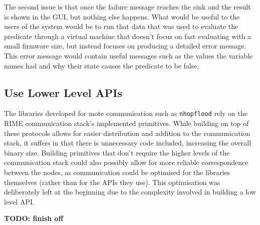 The second issue is that once the failure message reaches the sink and the result is shown in the GUI, but nothing else happens. What would be useful to the users of the system would be to run that data that was used to evaluate the predicate through a virtual machine that doesn't focus on fast evaluating with a small firmware size, but instead focuses on producing a detailed error message. This error message would contain useful messages such as the values the variable names had and why their state causes the predicate to be false.

\subsection{Use Lower Level APIs}

The libraries developed for mote communication such as \verb|nhopflood| rely on the RIME communication stack's implemented primitives. While building on top of these protocols allows for easier distribution and addition to the communication stack, it suffers in that there is unnecessary code included, increasing the overall binary size. Building primitives that don't require the higher levels of the communication stack could also possibly allow for more reliable correspondence between the nodes, as communication could be optimised for the libraries themselves (rather than for the APIs they use). This optimisation was deliberately left at the beginning due to the complexity involved in building a low level API.

\textbf{TODO: finish off}
